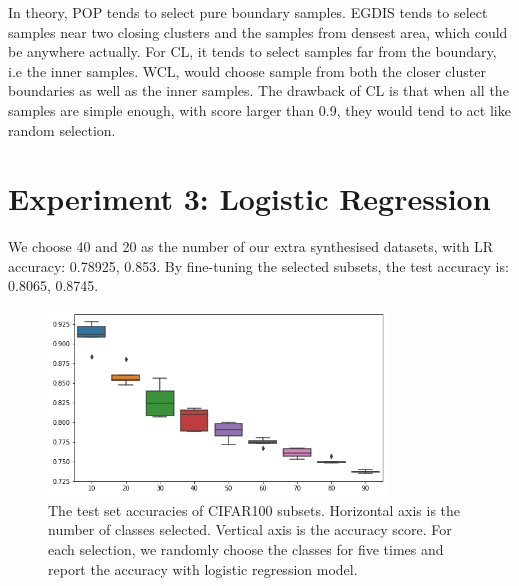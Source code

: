In theory, POP tends to select pure boundary samples. EGDIS tends to select samples near two closing clusters and the samples from densest area, which could be anywhere actually. For CL, it tends to select samples far from the boundary, i.e the inner samples. WCL, would choose sample from both the closer cluster boundaries as well as the inner samples. The drawback of CL is that when all the samples are simple enough, with score larger than 0.9, they would tend to act like random selection.



\section{Experiment 3: Logistic Regression}
\label{lr}
We choose 40 and 20 as the number of our extra synthesised datasets, with LR accuracy: 0.78925, 0.853. By fine-tuning the selected subsets, the test accuracy is: 0.8065, 0.8745.

 \begin{figure}[H]
 \centering
 \includegraphics[width=0.8\textwidth]{src/subsets.png}
 \caption{The test set accuracies of CIFAR100 subsets. Horizontal axis is the number of classes selected. Vertical axis is the accuracy score. For each selection, we randomly choose the classes for five times and report the accuracy with logistic regression model.}
 \label{Fig.logistic_subsets}
 \end{figure}
 
